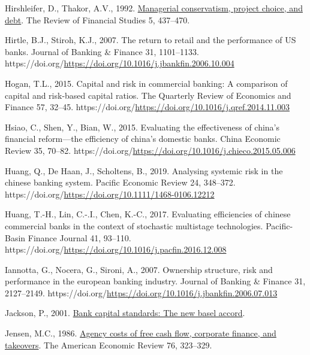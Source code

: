\documentclass[
  12pt,
  a4paper,
  DIV=11,
  numbers=noendperiod]{scrreprt}
\newlength{\cslhangindent}
\newenvironment{CSLReferences}[2] %
 {\begin{list}{}{%
  \setlength{\itemindent}{0pt}
  \setlength{\leftmargin}{0pt}
  \setlength{\parsep}{0pt}
  \ifodd #1
   \setlength{\leftmargin}{\cslhangindent}
   \setlength{\itemindent}{-1\cslhangindent}
  \fi
  \setlength{\itemsep}{#2\baselineskip}}}
 {\end{list}}
\begin{document}
\begin{CSLReferences}{1}{0}
Hirshleifer, D., Thakor, A.V., 1992.
\href{http://www.jstor.org.queens.ezp1.qub.ac.uk/stable/2962134}{Managerial
conservatism, project choice, and debt}. The Review of Financial Studies
5, 437--470.

Hirtle, B.J., Stiroh, K.J., 2007. The return to retail and the
performance of US banks. Journal of Banking \& Finance 31, 1101--1133.
https://doi.org/\url{https://doi.org/10.1016/j.jbankfin.2006.10.004}

Hogan, T.L., 2015. Capital and risk in commercial banking: A comparison
of capital and risk-based capital ratios. The Quarterly Review of
Economics and Finance 57, 32--45.
https://doi.org/\url{https://doi.org/10.1016/j.qref.2014.11.003}

Hsiao, C., Shen, Y., Bian, W., 2015. Evaluating the effectiveness of
china's financial reform---the efficiency of china's domestic banks.
China Economic Review 35, 70--82.
https://doi.org/\url{https://doi.org/10.1016/j.chieco.2015.05.006}

Huang, Q., De Haan, J., Scholtens, B., 2019. Analysing systemic risk in
the chinese banking system. Pacific Economic Review 24, 348--372.
https://doi.org/\url{https://doi.org/10.1111/1468-0106.12212}

Huang, T.-H., Lin, C.-.I., Chen, K.-C., 2017. Evaluating efficiencies of
chinese commercial banks in the context of stochastic multistage
technologies. Pacific-Basin Finance Journal 41, 93--110.
https://doi.org/\url{https://doi.org/10.1016/j.pacfin.2016.12.008}

Iannotta, G., Nocera, G., Sironi, A., 2007. Ownership structure, risk
and performance in the european banking industry. Journal of Banking \&
Finance 31, 2127--2149.
https://doi.org/\url{https://doi.org/10.1016/j.jbankfin.2006.07.013}

Jackson, P., 2001.
\href{https://www.bankofengland.co.uk/quarterly-bulletin/2001/q1/2001-bank-capital-standards-the-new-basel-accord}{Bank
capital standards: The new basel accord}.

Jensen, M.C., 1986.
\href{http://www.jstor.org.queens.ezp1.qub.ac.uk/stable/1818789}{Agency
costs of free cash flow, corporate finance, and takeovers}. The American
Economic Review 76, 323--329.


\end{CSLReferences}
\end{document}
